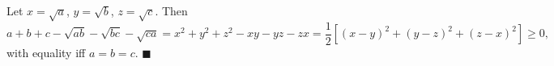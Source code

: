 Let $x=\sqrt a$, $y=\sqrt b$, $z=\sqrt c$. Then
\[
a+b+c-\sqrt{ab}-\sqrt{bc}-\sqrt{ca}=x^2+y^2+z^2-xy-yz-zx=\dfrac{1}{2}\left[(x-y)^2+(y-z)^2+(z-x)^2\right]\ge0,
\]
with equality iff $a=b=c$. $\blacksquare$
